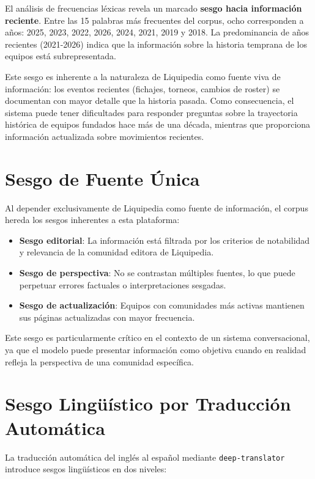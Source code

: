 El análisis de frecuencias léxicas revela un marcado \textbf{sesgo hacia información reciente}. Entre las 15 palabras más frecuentes del corpus, ocho corresponden a años: 2025, 2023, 2022, 2026, 2024, 2021, 2019 y 2018. La predominancia de años recientes (2021-2026) indica que la información sobre la historia temprana de los equipos está subrepresentada.

Este sesgo es inherente a la naturaleza de Liquipedia como fuente viva de información: los eventos recientes (fichajes, torneos, cambios de roster) se documentan con mayor detalle que la historia pasada. Como consecuencia, el sistema puede tener dificultades para responder preguntas sobre la trayectoria histórica de equipos fundados hace más de una década, mientras que proporciona información actualizada sobre movimientos recientes.

\section{Sesgo de Fuente Única}

Al depender exclusivamente de Liquipedia como fuente de información, el corpus hereda los sesgos inherentes a esta plataforma:

\begin{itemize}
    \item \textbf{Sesgo editorial}: La información está filtrada por los criterios de notabilidad y relevancia de la comunidad editora de Liquipedia.
    \item \textbf{Sesgo de perspectiva}: No se contrastan múltiples fuentes, lo que puede perpetuar errores factuales o interpretaciones sesgadas.
    \item \textbf{Sesgo de actualización}: Equipos con comunidades más activas mantienen sus páginas actualizadas con mayor frecuencia.
\end{itemize}

Este sesgo es particularmente crítico en el contexto de un sistema conversacional, ya que el modelo puede presentar información como objetiva cuando en realidad refleja la perspectiva de una comunidad específica.


\section{Sesgo Lingüístico por Traducción Automática}

La traducción automática del inglés al español mediante \texttt{deep-translator} introduce sesgos lingüísticos en dos niveles:

